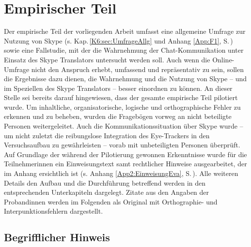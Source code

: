 \chapter{Empirischer Teil} %

\label{K5} %


Der empirische Teil der vorliegenden Arbeit umfasst eine allgemeine Umfrage zur Nutzung von Skype (s. Kap.\,\ref{K6:sec:UmfrageAllg} und Anhang \ref{App:F1}, S.\,\pageref{App:F1}) sowie eine Fallstudie, mit der die Wahrnehmung der Chat-Kommunikation unter Einsatz des Skype Translators untersucht werden soll. Auch wenn die Online-Umfrage nicht den Anspruch erhebt, umfassend und repräsentativ zu sein, sollen die Ergebnisse dazu dienen, die Wahrnehmung und die Nutzung von Skype -- und im Speziellen des Skype Translators -- besser einordnen zu können. An dieser Stelle sei bereits darauf hingewiesen, dass der gesamte empirische Teil pilotiert wurde. Um inhaltliche, organisatorische, logische und orthographische Fehler zu erkennen und zu beheben, wurden die Fragebögen vorweg an nicht beteiligte Personen weitergeleitet. Auch die Kommunikationssituation über Skype wurde -- um nicht zuletzt die reibungslose Integration des Eye-Trackers in den Versuchsaufbau zu gewährleisten -- vorab mit unbeteiligten Personen überprüft. Auf Grundlage der während der Pilotierung gewonnen Erkenntnisse wurde für die Teilnehmer{\textperiodcentered}innen ein Einweisungstext samt rechtlicher Hinweise ausgearbeitet, der im Anhang ersichtlich ist (s. Anhang \ref{App2:EinweisungEva}, S.\,\pageref{App2:EinweisungEva}). Alle weiteren Details den Aufbau und die Durchführung betreffend werden in den entsprechenden Unterkapiteln dargelegt. Zitate aus den Angaben der Proband{\textperiodcentered}innen werden im Folgenden als Original mit Orthographie- und Interpunktionsfehlern dargestellt.


\section{Begrifflicher Hinweis}
\label{K5:sec:begrifflicher-hinweis}


